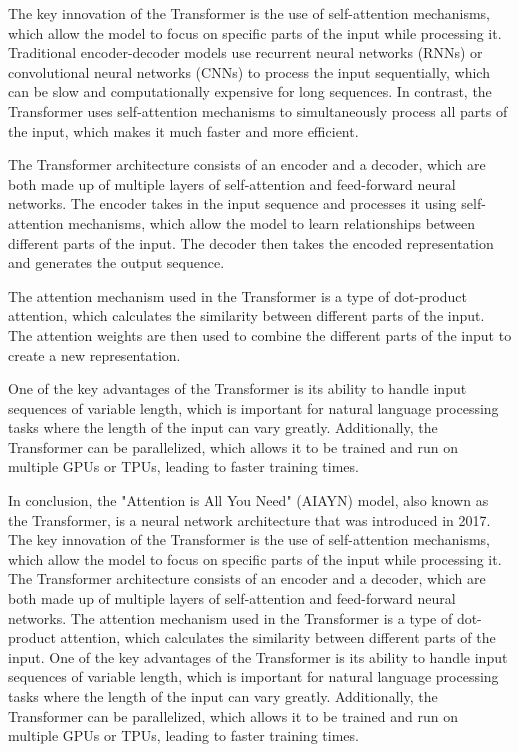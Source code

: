 The key innovation of the Transformer is the use of self-attention mechanisms, which allow the model to focus on specific parts of the input while processing it. Traditional encoder-decoder models use recurrent neural networks (RNNs) or convolutional neural networks (CNNs) to process the input sequentially, which can be slow and computationally expensive for long sequences. In contrast, the Transformer uses self-attention mechanisms to simultaneously process all parts of the input, which makes it much faster and more efficient.

The Transformer architecture consists of an encoder and a decoder, which are both made up of multiple layers of self-attention and feed-forward neural networks. The encoder takes in the input sequence and processes it using self-attention mechanisms, which allow the model to learn relationships between different parts of the input. The decoder then takes the encoded representation and generates the output sequence.

The attention mechanism used in the Transformer is a type of dot-product attention, which calculates the similarity between different parts of the input. The attention weights are then used to combine the different parts of the input to create a new representation.

One of the key advantages of the Transformer is its ability to handle input sequences of variable length, which is important for natural language processing tasks where the length of the input can vary greatly. Additionally, the Transformer can be parallelized, which allows it to be trained and run on multiple GPUs or TPUs, leading to faster training times.

In conclusion, the "Attention is All You Need" (AIAYN) model, also known as the Transformer, is a neural network architecture that was introduced in 2017. The key innovation of the Transformer is the use of self-attention mechanisms, which allow the model to focus on specific parts of the input while processing it. The Transformer architecture consists of an encoder and a decoder, which are both made up of multiple layers of self-attention and feed-forward neural networks. The attention mechanism used in the Transformer is a type of dot-product attention, which calculates the similarity between different parts of the input. One of the key advantages of the Transformer is its ability to handle input sequences of variable length, which is important for natural language processing tasks where the length of the input can vary greatly. Additionally, the Transformer can be parallelized, which allows it to be trained and run on multiple GPUs or TPUs, leading to faster training times.


